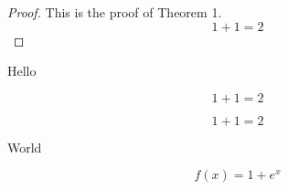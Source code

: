 \documentclass{minimal}
\begin{document}
\begin{proof}
  This is the proof of Theorem 1.
  \begin{equation}
    1+1=2
  \end{equation}
\end{proof}

Hello

\begin{equation}
  1+1=2
\end{equation}

\begin{equation*}
  1+1=2
\end{equation*}

World

\begin{equation}
  f(x) = 1 + e^x
\end{equation}
\end{document}
